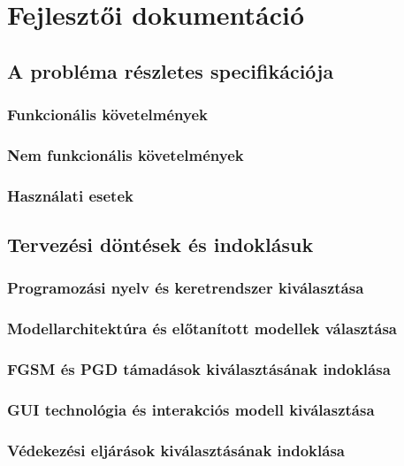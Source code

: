 \documentclass[12pt,a4paper]{article}
\begin{document}
\newpage
\section{Fejlesztői dokumentáció}

\subsection{A probléma részletes specifikációja}

\subsubsection{Funkcionális követelmények}

\subsubsection{Nem funkcionális követelmények}

\subsubsection{Használati esetek}

\subsection{Tervezési döntések és indoklásuk}

\subsubsection{Programozási nyelv és keretrendszer kiválasztása}

\subsubsection{Modellarchitektúra és előtanított modellek választása}

\subsubsection{FGSM és PGD támadások kiválasztásának indoklása}

\subsubsection{GUI technológia és interakciós modell kiválasztása}

\subsubsection{Védekezési eljárások kiválasztásának indoklása}
\end{document}
